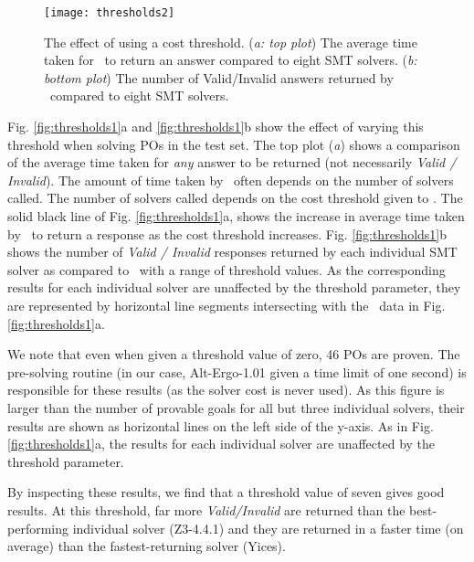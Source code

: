 \begin{figure}
	\centering
	\texttt{[image: thresholds2]}
	\caption[The effect of using a cost threshold]{The effect of using a cost threshold. (\textit{a: top plot}) The average time taken for \where~to return an answer compared to eight SMT solvers. (\textit{b: bottom plot}) The number of Valid/Invalid answers returned by \where~compared to eight SMT solvers.}
	\label{fig:thresholds2}
\end{figure}



Fig. \ref{fig:thresholds1}a and \ref{fig:thresholds1}b show the effect of varying this threshold when solving POs in the test set.
The top plot (\textit{a}) shows a comparison of the average time taken for \textit{any} answer to be returned (not necessarily \textit{Valid / Invalid}).
The amount of time taken by \where~often depends on the number of solvers called.
The number of solvers called depends on the cost threshold given to \where. 
The solid black line of Fig. \ref{fig:thresholds1}a, shows the increase in average time taken by \where~to return a response as the cost threshold increases.
Fig. \ref{fig:thresholds1}b shows the number of \textit{Valid / Invalid} responses returned by each individual SMT solver as compared to \where~with a range of threshold values.
As the corresponding results for each individual solver are unaffected by the threshold parameter, they are represented by horizontal line segments intersecting with the \where~data in Fig. \ref{fig:thresholds1}a.

We note that even when given a threshold value of zero, 46 POs are proven.
The pre-solving routine (in our case, Alt-Ergo-1.01 given a time limit of one second) is responsible for these results (as the solver cost is never used).
As this figure is larger than the number of provable goals for all but three individual solvers, their results are shown as horizontal lines on the left side of the y-axis.
As in Fig. \ref{fig:thresholds1}a, the results for each individual solver are unaffected by the threshold parameter.

By inspecting these results, we find that a threshold value of seven gives good results.
At this threshold, far more \textit{Valid/Invalid} are returned than the best-performing individual solver (Z3-4.4.1) and they are returned in a faster time (on average) than the fastest-returning solver (Yices).

